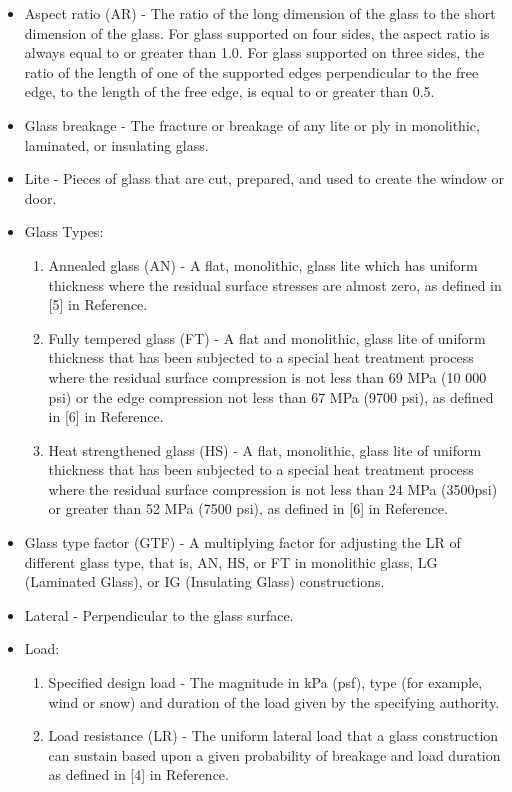 \documentclass[12pt]{article}
\begin{document}
\begin{itemize}
\item{Aspect ratio (AR) - The ratio of the long dimension of the glass to the short dimension of the glass. For glass supported on four sides, the aspect ratio is always equal to or greater than 1.0. For glass supported on three sides, the ratio of the length of one of the supported edges perpendicular to the free edge, to the length of the free edge, is equal to or greater than 0.5.}
\item{Glass breakage - The fracture or breakage of any lite or ply in monolithic, laminated, or insulating glass.}
\item{Lite - Pieces of glass that are cut, prepared, and used to create the window or door.}
\item{Glass Types:}
\begin{enumerate}
\item{Annealed glass (AN) - A flat, monolithic, glass lite which has uniform thickness where the residual surface stresses are almost zero, as defined in [5] in Reference.}
\item{Fully tempered glass (FT) - A flat and monolithic, glass lite of uniform thickness that has been subjected to a special heat treatment process where the residual surface compression is not less than 69 MPa (10 000 psi) or the edge compression not less than 67 MPa (9700 psi), as defined in [6] in Reference.}
\item{Heat strengthened glass (HS) - A flat, monolithic, glass lite of uniform thickness that has been subjected to a special heat treatment process where the residual surface compression is not less than 24 MPa (3500psi) or greater than 52 MPa (7500 psi), as defined in [6] in Reference.}
\end{enumerate}
\item{Glass type factor (GTF) - A multiplying factor for adjusting the LR of different glass type, that is, AN, HS, or FT in monolithic glass, LG (Laminated Glass), or IG (Insulating Glass) constructions.}
\item{Lateral - Perpendicular to the glass surface.}
\item{Load:}
\begin{enumerate}
\item{Specified design load - The magnitude in kPa (psf), type (for example, wind or snow) and duration of the load given by the specifying authority.}
\item{Load resistance (LR) - The uniform lateral load that a glass construction can sustain based upon a given probability of breakage and load duration as defined in [4] in Reference.}

\end{enumerate}
\end{itemize}
\end{document}
